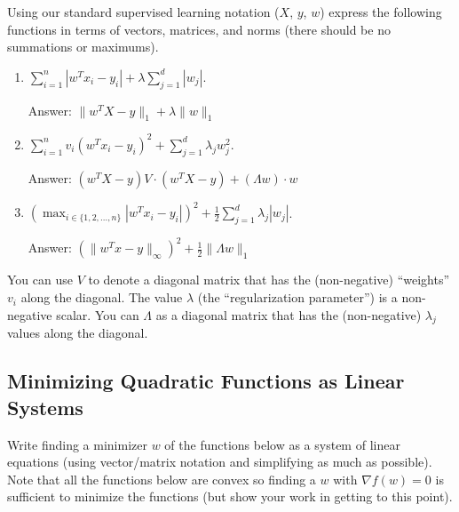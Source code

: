 \documentclass{article}
\def\ans#1{\par\gre{Answer: #1}}
\def\blu#1{{\color{blu}#1}}
\def\gre#1{{\color{gre}#1}}
\def\half{\frac 1 2}
\def\enum#1{\begin{enumerate}#1\end{enumerate}}
\begin{document}
Using our standard supervised learning notation ($X$, $y$, $w$)
express the following functions in terms of vectors, matrices, and norms (there should be no summations or maximums).
\blu{\enum{
\item $\sum_{i=1}^n  |w^Tx_i - y_i| + \lambda \sum_{j=1}^{d} |w_j|$. \ans{$ \|w^TX - y\|_1 + \lambda \|w\|_1$}
\item $\sum_{i=1}^n v_i (w^Tx_i - y_i)^2 + \sum_{j=1}^{d} \lambda_j w_j^2$. \ans{$ (w^TX-y)V \cdot (w^TX-y) + (\Lambda w) \cdot w$}
\item $\left(\max_{i \in \{1,2,\dots,n\}} |w^Tx_i - y_i|\right)^2 +  \half\sum_{j=1}^{d} \lambda_j|w_j|$.  \ans{$(\|w^Tx-y\| _{\infty})^2 + \frac{1}{2} \|\Lambda w\|_1$}
}}
You can use $V$ to denote a diagonal matrix that has the (non-negative) ``weights'' $v_i$ along the diagonal. The value $\lambda$ (the ``regularization parameter'') is a non-negative scalar. You can $\Lambda$ as a diagonal matrix that has the (non-negative) $\lambda_j$ values along the diagonal.


\subsection{Minimizing Quadratic Functions as Linear Systems}

Write finding a minimizer $w$ of the functions below as a system of linear equations (using vector/matrix notation and simplifying as much as possible). Note that all the functions below are convex  so finding a $w$ with $\nabla f(w) = 0$ is sufficient to minimize the functions (but show your work in getting to this point).
\end{document}
